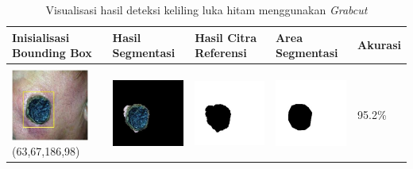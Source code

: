 \begin{table}[H]
	\centering
	\caption{Visualisasi hasil deteksi keliling luka hitam menggunakan \emph{Grabcut}}
	\label{tabel_hasil_4}
	\begin{tabular}{|m{1.0in}|m{1.0in}|m{1.0in}|m{1.0in}|m{0.6in}|}
		\hline
		\textbf{Inisialisasi Bounding Box} & \textbf{Hasil Segmentasi} & \textbf{Hasil Citra Referensi} & \textbf{Area Segmentasi} & \textbf{Akurasi} \\
		\hline
		
		&  &  & \\
		\includegraphics[width=1.0in]{gambar/hasil_segmentasi/luka_hitam/image_28_rect.jpg} {\centering\fontsize{10}{10}\selectfont(63,67,186,98)}&
		\includegraphics[width=1.0in]{gambar/hasil_segmentasi/luka_hitam/result_28.jpg}&
		\includegraphics[width=1.0in]{gambar/hasil_segmentasi/luka_hitam/mask_r_28.jpg}&
		\includegraphics[width=1.0in]{gambar/hasil_segmentasi/luka_hitam/28_r.jpg}&
		95.2\% \\
		\hline 


\end{tabular}
\end{table}
